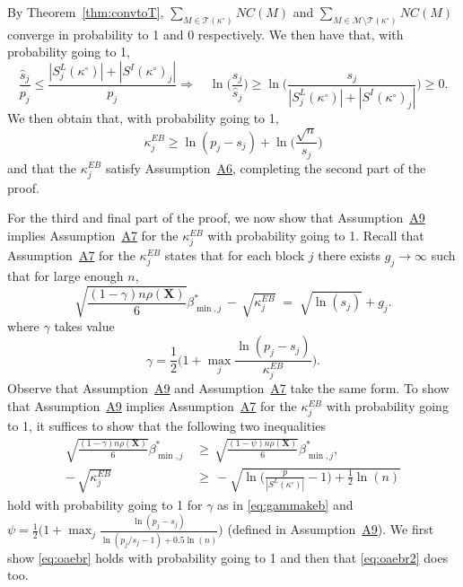 \documentclass[bj,authoryear]{imsart}
\theoremstyle{plain}
\newcommand{\M}{\mathcal{M}}
\newcommand{\T}{\mathcal{T}}
\newcommand{\bs}{\boldsymbol}
\begin{document}
By Theorem~\ref{thm:convtoT}, $\sum_{M \in \T(\kappa^{\circ})}NC(M)$ and $\sum_{M \in \M\setminus\T(\kappa^{\circ})}NC(M)$ converge in probability to 1 and 0 respectively. We then have that, with probability going to 1,
\begin{equation*}
    \frac{\hat{s}_j}{p_j}\leq \frac{|S^{L}_j(\kappa^{\circ})|+|S^{I}(\kappa^{\circ})_j|}{p_j} \Longrightarrow
    \quad\ln\Big(\frac{s_j}{\hat{s}_j}\Big)\geq \ln\bigg(\frac{s_j}{|S^{L}_j(\kappa^{\circ})|+|S^{I}(\kappa^{\circ})_j|} \bigg) \geq 0.
\end{equation*}
We then obtain that, with probability going to 1,
\begin{equation}\label{eq:eeeeeeeh}
    \kappa^{EB}_j
    \geq  \ln(p_j-s_j)+\ln\Big(\frac{\sqrt{n}}{s_j}\Big)
\end{equation}
and that the $\kappa^{EB}_j$ satisfy Assumption~\hyperlink{lab:A6}{A6}, completing the second part of the proof.\medskip

For the third and final part of the proof, 
we now show that Assumption~\hyperlink{lab:A9}{A9} implies Assumption~\hyperlink{lab:A7}{A7} for the $\kappa_j^{EB}$ with probability going to 1. Recall that Assumption~\hyperlink{lab:A7}{A7} for the $\kappa_j^{EB}$ states that for each block $j$ there exists $g_j\to \infty$ such that for large enough $n$,
    \begin{equation*}
        \sqrt{\frac{(1-\gamma) n\rho(\bs X)}{6}}{{\beta_{\min,j}^*}} \,- \,\sqrt{\kappa^{EB}_j} \;=\; \sqrt{\ln(s_j)} + g_j .
    \end{equation*}
where $\gamma$ takes value
\begin{equation}\label{eq:gammakeb}
    \gamma=\frac12\Big(1+\max_j\frac{\ln(p_j-s_j)}{\kappa^{EB}_j}\Big).
\end{equation}
Observe that Assumption~\hyperlink{lab:A9}{A9} and Assumption~\hyperlink{lab:A7}{A7} take the same form. To show that Assumption~\hyperlink{lab:A9}{A9} implies Assumption~\hyperlink{lab:A7}{A7} for the $\kappa_j^{EB}$ with probability going to 1, it suffices to show that the following two inequalities
\begin{align}
    \sqrt{\frac{ (1-\gamma)n\rho(\bs X)}{6}}{\beta_{\min,j}^*} \,&\geq \,  \sqrt{\frac{ (1-\psi)n\rho(\bs X)}{6}}{\beta_{\min,j}^*}, \label{eq:oaebr} \\
    - \,\sqrt{\kappa^{EB}_j} \,&\geq \,-\sqrt{\ln\bigg(\frac{p}{|S^{L}(\kappa^{\circ})|}-1\bigg)+\frac12\ln(n)}\label{eq:oaebr2}
\end{align}
hold with probability going to 1 for $\gamma$ as in \eqref{eq:gammakeb} and $\psi=\frac12\big(1+\max_j \frac{\ln(p_j-s_j)}{\ln(p_j/s_j-1)+0.5\ln(n)}\big)$ (defined in Assumption~\hyperlink{lab:A9}{A9}). We first show \eqref{eq:oaebr} holds with probability going to 1 and then that \eqref{eq:oaebr2} does too.
\end{document}
